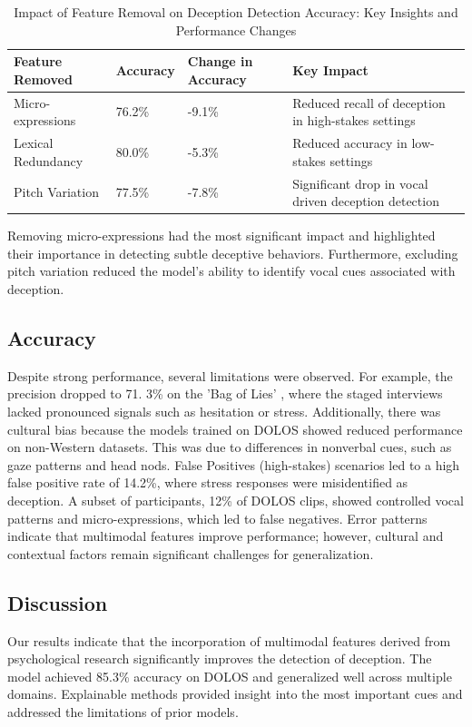 \documentclass{article} %
\begin{document}
\begin{table}
\centering
\footnotesize
\renewcommand{\arraystretch}{1.3}
\addtolength{\tabcolsep}{-2.5pt}
\begin{tabular}{p{3cm} l p{3cm} p{3cm}}
\hline
\textbf{Feature Removed} & \textbf{Accuracy} & \textbf{Change in Accuracy}& \textbf{Key Impact} \\
\hline
Micro-expressions  & 76.2\% & -9.1\% & Reduced recall of deception in high-stakes settings \\
Lexical Redundancy & 80.0\% & -5.3\% & Reduced accuracy in low-stakes settings \\
Pitch Variation & 77.5\% & -7.8\% & Significant drop in vocal driven deception detection \\
\hline
\end{tabular}

\label{tab:my_label}
\caption{Impact of Feature Removal on Deception Detection Accuracy: Key Insights and Performance Changes}
\end{table}
Removing micro-expressions had the most significant impact and highlighted their importance in detecting subtle deceptive behaviors. Furthermore, excluding pitch variation reduced the model’s ability to identify vocal cues associated with deception. 

\subsection{Accuracy}
Despite strong performance, several limitations were observed. For example, the precision dropped to 71. 3\% on the 'Bag of Lies' \citep{9025340}, where the staged interviews lacked pronounced signals such as hesitation or stress. Additionally, there was cultural bias because the models trained on DOLOS showed reduced performance on non-Western datasets. This was due to differences in nonverbal cues, such as gaze patterns and head nods. False Positives (high-stakes) scenarios led to a high false positive rate of 14.2\%, where stress responses were misidentified as deception. A subset of participants, 12\% of DOLOS clips, showed controlled vocal patterns and micro-expressions, which led to false negatives. Error patterns indicate that multimodal features improve performance; however, cultural and contextual factors remain significant challenges for generalization. 

\subsection{Discussion}
Our results indicate that the incorporation of multimodal features derived from psychological research significantly improves the detection of deception. The model achieved 85.3\% accuracy on DOLOS and generalized well across multiple domains. Explainable methods provided insight into the most important cues and addressed the limitations of prior models.
\end{document}
